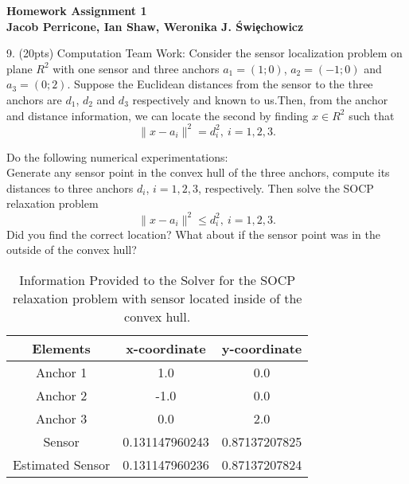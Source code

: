 \documentclass[12pt,letterpaper]{article}
\begin{document}
\pagestyle{empty}
\def \NATUR{ I \hspace*{-0.8ex} N}
\def \REALES{ I \hspace*{-0.8ex} R}
\renewcommand{\labelenumi}{\alph{enumi})}
\renewcommand{\labelenumii}{\roman{enumii})}



\bigskip

\begin{center}
{\large \bf Homework Assignment 1 \\  Jacob Perricone, Ian Shaw, Weronika J. \'Swi\c echowicz}
\end{center}



\bigskip





9. (20pts) Computation Team Work: Consider the sensor localization problem on plane $R^2$ with one sensor and three anchors $a_1=(1;0)$, $a_2=(-1;0)$ and $a_3=(0;2)$. Suppose the Euclidean distances from the sensor to the three anchors are $d_1$, $d_2$ and $d_3$ respectively and known to us.Then, from the anchor and distance information, we can locate the second by finding $x\in R^2$ such that
\[\|x-a_i\|^2=d^2_i,\ i=1,2,3.\]

Do the following numerical experimentations: \\
Generate any sensor point in the convex hull of the three anchors, compute its distances to three anchors $d_i$, $i=1,2,3$, respectively. Then solve the SOCP relaxation problem
\[\|x-a_i\|^2\le d^2_i,\ i=1,2,3.\]
Did you find the correct location? What about if the sensor point was in the outside of the convex hull?
\begin{table}[h]
\begin{center}
\caption{Information Provided to the Solver for the SOCP relaxation problem with sensor located inside of the convex hull.}
\vspace{.3cm}
\begin{tabular}{|c|c|c|}
\hline
        Elements  & x-coordinate & y-coordinate \\ \hline
               Anchor 1  &  1.0 &  0.0\\ 
       Anchor 2  &  -1.0 &  0.0\\ 
       Anchor 3  &  0.0 &  2.0\\ 
       Sensor  &  0.131147960243&  0.87137207825\\ 
       Estimated Sensor  &  0.131147960236&  0.87137207824\\ \hline

\hline
\end{tabular}
\end{center}
\end{table}
\end{document}
